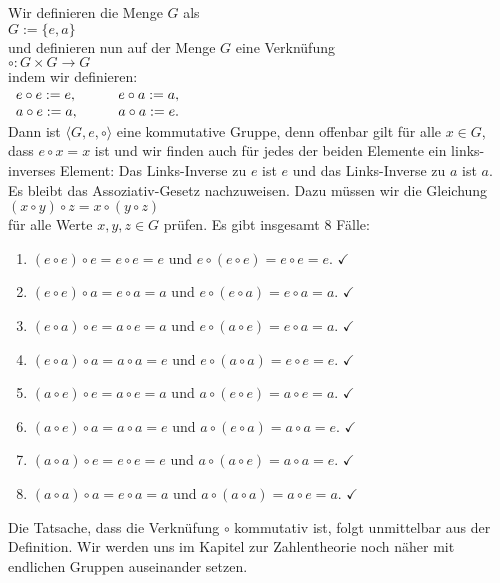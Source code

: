 \begin{enumerate}
      Wir definieren die Menge $G$ als
      \\[0.2cm]
      \hspace*{1.3cm}
      $G := \{ e, a \}$
      \\[0.2cm]
      und definieren nun auf der Menge $G$ eine Verknüfung
      \\[0.2cm]
      \hspace*{1.3cm}
      $\circ: G \times G \rightarrow G$
      \\[0.2cm]
      indem wir definieren:
      \\[0.2cm]
      \hspace*{1.3cm}
      $
      \begin{array}[t]{lcl}
        e \circ e := e, & \quad & e \circ a := a, \\
        a \circ e := a, & \quad & a \circ a := e. 
      \end{array}
      $
      \\[0.2cm]
      Dann ist $\langle G, e, \circ \rangle$ eine kommutative Gruppe, denn offenbar gilt für alle $x \in G$, dass 
      $e \circ x = x$ ist und wir finden auch für jedes der beiden Elemente ein links-inverses Element:
      Das Links-Inverse zu $e$ ist $e$ und das Links-Inverse zu $a$ ist $a$.  Es bleibt das
      Assoziativ-Gesetz nachzuweisen.  Dazu müssen wir die Gleichung
      \\[0.2cm]
      \hspace*{1.3cm}
      $(x \circ y) \circ z = x \circ (y \circ z)$
      \\[0.2cm]
      für alle Werte $x,y,z \in G$ prüfen.  Es gibt insgesamt 8 Fälle:
      \begin{enumerate}
      \item $(e \circ e) \circ e = e \circ e = e$ und $e \circ (e \circ e) = e \circ e = e$. $\checkmark$
      \item $(e \circ e) \circ a = e \circ a = a$ und $e \circ (e \circ a) = e \circ a = a$. $\checkmark$
      \item $(e \circ a) \circ e = a \circ e = a$ und $e \circ (a \circ e) = e \circ a = a$. $\checkmark$
      \item $(e \circ a) \circ a = a \circ a = e$ und $e \circ (a \circ a) = e \circ e = e$. $\checkmark$
      \item $(a \circ e) \circ e = a \circ e = a$ und $a \circ (e \circ e) = a \circ e = a$. $\checkmark$
      \item $(a \circ e) \circ a = a \circ a = e$ und $a \circ (e \circ a) = a \circ a = e$. $\checkmark$
      \item $(a \circ a) \circ e = e \circ e = e$ und $a \circ (a \circ e) = a \circ a = e$. $\checkmark$
      \item $(a \circ a) \circ a = e \circ a = a$ und $a \circ (a \circ a) = a \circ e = a$. $\checkmark$
      \end{enumerate}
      Die Tatsache, dass die Verknüfung $\circ$ kommutativ ist, folgt unmittelbar aus der Definition.
      Wir werden uns im Kapitel zur Zahlentheorie noch näher mit endlichen Gruppen auseinander
      setzen.
      \eox
\end{enumerate}

